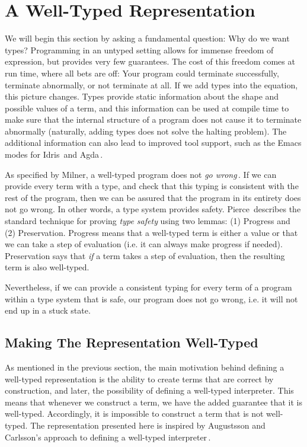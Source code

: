 \section{A Well-Typed Representation}
\label{sec:a-well-typed-expression-language}

We will begin this section by asking a fundamental question: Why do we want types? Programming in an untyped setting allows for immense freedom of expression, but provides very few guarantees. The cost of this freedom comes at run time, where all bets are off: Your program could terminate successfully, terminate abnormally, or not terminate at all. If we add types into the equation, this picture changes. Types provide static information about the shape and possible values of a term, and this information can be used at compile time to make sure that the internal structure of a program does not cause it to terminate abnormally (naturally, adding types does not solve the halting problem). The additional information can also lead to improved tool support, such as the Emacs modes for Idris\,\cite{Idris:EmacsMode} and Agda\,\cite{AgdaMode}. 

As specified by Milner, a well-typed program does not \emph{go wrong}\,\cite{Milner78atheory}. If we can provide every term with a type, and check that this typing is consistent with the rest of the program, then we can be assured that the program in its entirety does not go wrong. In other words, a type system provides safety. Pierce\,\cite[Section~8.3]{Pierce:TypeSystems} describes the standard technique for proving \emph{type safety} using two lemmas: (1) Progress and (2) Preservation. Progress means that a well-typed term is either a value or that we can take a step of evaluation (i.e. it can always make progress if needed). Preservation says that \emph{if} a term takes a step of evaluation, then the resulting term is also well-typed.

Nevertheless, if we can provide a consistent typing for every term of a program within a type system that is safe, our program does not go wrong, i.e. it will not end up in a stuck state. 

\subsection{Making The Representation Well-Typed}
\label{sec:making-the-representation-well-typed}
As mentioned in the previous section, the main motivation behind defining a well-typed representation is the ability to create terms that are correct by construction, and later, the possibility of defining a well-typed interpreter. This means that whenever we construct a term, we have the added guarantee that it is well-typed. Accordingly, it is impossible to construct a term that is not well-typed. The representation presented here is inspired by Augustsson and Carlsson's approach to defining a well-typed interpreter\,\cite{Augustsson99anexercise}.


